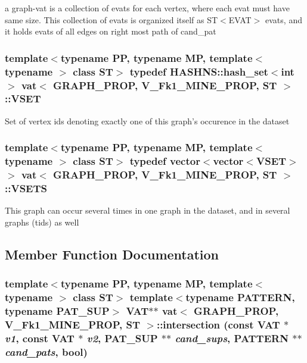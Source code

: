 a graph-vat is a collection of evats for each vertex, where each evat must have same size. This collection of evats is organized itself as ST$<$EVAT$>$ evats, and it holds evats of all edges on right most path of cand\_\-pat 
\subsubsection{\setlength{\rightskip}{0pt plus 5cm}template$<$typename PP, typename MP, template$<$ typename $>$ class ST$>$ typedef HASHNS::hash\_\-set$<$int$>$ {\bf vat}$<$ GRAPH\_\-PROP, V\_\-Fk1\_\-MINE\_\-PROP, ST $>$::{\bf VSET}}\label{classvat_3_01GRAPH__PROP_00_01V__Fk1__MINE__PROP_00_01ST_01_4_w4}


Set of vertex ids denoting exactly one of this graph's occurence in the dataset 
\subsubsection{\setlength{\rightskip}{0pt plus 5cm}template$<$typename PP, typename MP, template$<$ typename $>$ class ST$>$ typedef vector$<$vector$<${\bf VSET}$>$ $>$ {\bf vat}$<$ GRAPH\_\-PROP, V\_\-Fk1\_\-MINE\_\-PROP, ST $>$::{\bf VSETS}}\label{classvat_3_01GRAPH__PROP_00_01V__Fk1__MINE__PROP_00_01ST_01_4_w5}


This graph can occur several times in one graph in the dataset, and in several graphs (tids) as well 

\subsection{Member Function Documentation}
\subsubsection{\setlength{\rightskip}{0pt plus 5cm}template$<$typename PP, typename MP, template$<$ typename $>$ class ST$>$ template$<$typename PATTERN, typename PAT\_\-SUP$>$ {\bf VAT}$\ast$$\ast$ {\bf vat}$<$ GRAPH\_\-PROP, V\_\-Fk1\_\-MINE\_\-PROP, ST $>$::intersection (const {\bf VAT} $\ast$ {\em v1}, const {\bf VAT} $\ast$ {\em v2}, PAT\_\-SUP $\ast$$\ast$ {\em cand\_\-sups}, PATTERN $\ast$$\ast$ {\em cand\_\-pats}, bool)\hspace{0.3cm}{\tt  [inline, static]}}\label{classvat_3_01GRAPH__PROP_00_01V__Fk1__MINE__PROP_00_01ST_01_4_e0}


